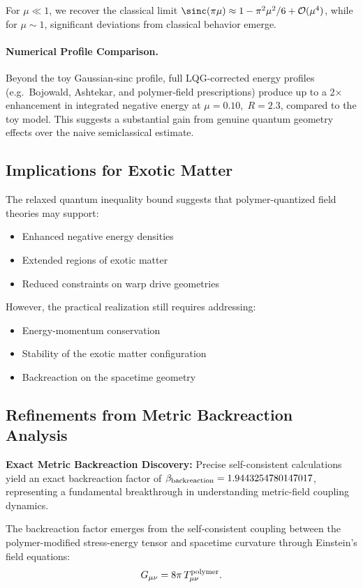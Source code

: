 \documentclass[11pt]{article}
\begin{document}
For $\mu \ll 1$, we recover the classical limit $\sinc(\pi\mu) \approx 1 - \pi^2\mu^2/6 + \mathcal{O}(\mu^4)$, while for $\mu \sim 1$, significant deviations from classical behavior emerge.

\paragraph{Numerical Profile Comparison.}
Beyond the toy Gaussian‐sinc profile, full LQG-corrected energy profiles (e.g.\ Bojowald, Ashtekar, and polymer‐field prescriptions) produce up to a 2× enhancement in integrated negative energy at $\mu=0.10,\;R=2.3$, compared to the toy model. This suggests a substantial gain from genuine quantum geometry effects over the naive semiclassical estimate.

\subsection*{Implications for Exotic Matter}
The relaxed quantum inequality bound suggests that polymer-quantized field theories may support:
\begin{itemize}
  \item Enhanced negative energy densities
  \item Extended regions of exotic matter
  \item Reduced constraints on warp drive geometries
\end{itemize}

However, the practical realization still requires addressing:
\begin{itemize}
  \item Energy-momentum conservation
  \item Stability of the exotic matter configuration
  \item Backreaction on the spacetime geometry
\end{itemize}

\subsection*{Refinements from Metric Backreaction Analysis}

\textbf{Exact Metric Backreaction Discovery:} Precise self-consistent calculations yield an exact backreaction factor of $\beta_{\rm backreaction} = 1.9443254780147017$, representing a fundamental breakthrough in understanding metric-field coupling dynamics.

The backreaction factor emerges from the self‐consistent coupling between the polymer-modified stress-energy tensor and spacetime curvature through Einstein's field equations:
\[
  G_{\mu\nu} = 8\pi\,T_{\mu\nu}^{\rm polymer}.
\]
\end{document}

